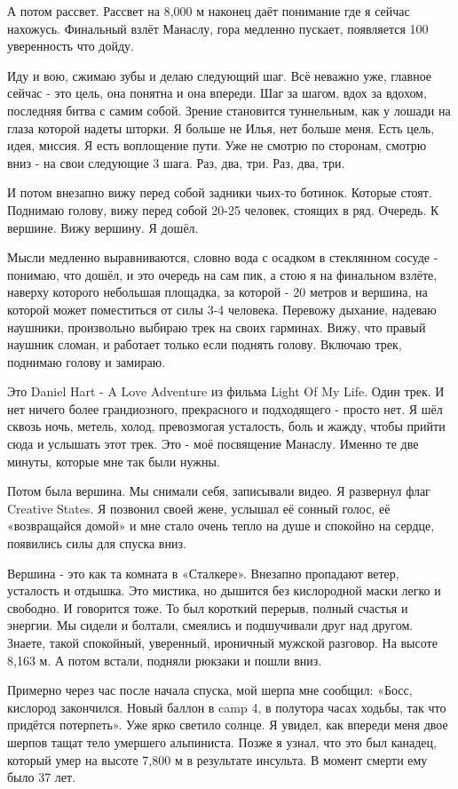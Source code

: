 А потом рассвет. Рассвет на 8,000 м наконец даёт понимание где я сейчас
нахожусь. Финальный взлёт Манаслу, гора медленно пускает, появляется 100%
уверенность что дойду. 

Иду и вою, сжимаю зубы и делаю следующий шаг. Всё неважно уже, главное сейчас -
это цель, она понятна и она впереди. Шаг за шагом, вдох за вдохом, последняя
битва с самим собой. Зрение становится туннельным, как у лошади на глаза
которой надеты шторки. Я больше не Илья, нет больше меня. Есть цель, идея,
миссия. Я есть воплощение пути. Уже не смотрю по сторонам, смотрю вниз - на
свои следующие 3 шага. Раз, два, три. Раз, два, три. 

И потом внезапно вижу перед собой задники чьих-то ботинок. Которые стоят.
Поднимаю голову, вижу перед собой 20-25 человек, стоящих в ряд. Очередь. К
вершине. Вижу вершину. Я дошёл. 

Мысли медленно выравниваются, словно вода с осадком в стеклянном сосуде -
понимаю, что дошёл, и это очередь на сам пик, а стою я на финальном взлёте,
наверху которого небольшая площадка, за которой - 20 метров и вершина, на
которой может поместиться от силы 3-4 человека. Перевожу дыхание, надеваю
наушники, произвольно выбираю трек на своих гарминах. Вижу, что правый наушник
сломан, и работает только если поднять голову. Включаю трек, поднимаю голову и
замираю. 

Это Daniel Hart - A Love Adventure из фильма Light Of My Life. Один трек. И нет
ничего более грандиозного, прекрасного и подходящего - просто нет. Я шёл сквозь
ночь, метель, холод, превозмогая усталость, боль и жажду, чтобы прийти сюда и
услышать этот трек. Это - моё посвящение Манаслу. Именно те две минуты, которые
мне так были нужны. 

Потом была вершина. Мы снимали себя, записывали видео. Я развернул флаг
Creative States. Я позвонил своей жене, услышал её сонный голос, её
«возвращайся домой» и мне стало очень тепло на душе и спокойно на сердце,
появились силы для спуска вниз. 

Вершина - это как та комната в «Сталкере». Внезапно пропадают ветер, усталость
и отдышка. Это мистика, но дышится без кислородной маски легко и свободно. И
говорится тоже. То был короткий перерыв, полный счастья и энергии. Мы сидели и
болтали, смеялись и подшучивали друг над другом. Знаете, такой спокойный,
уверенный, ироничный мужской разговор. На высоте 8,163 м. А потом встали,
подняли рюкзаки и пошли вниз. 

Примерно через час после начала спуска, мой шерпа мне сообщил: «Босс, кислород
закончился. Новый баллон в camp 4, в полутора часах ходьбы, так что придётся
потерпеть». Уже ярко светило солнце. Я увидел, как впереди меня двое шерпов
тащат тело умершего альпиниста. Позже я узнал, что это был канадец, который
умер на высоте 7,800 м в результате инсульта. В момент смерти ему было 37 лет. 

